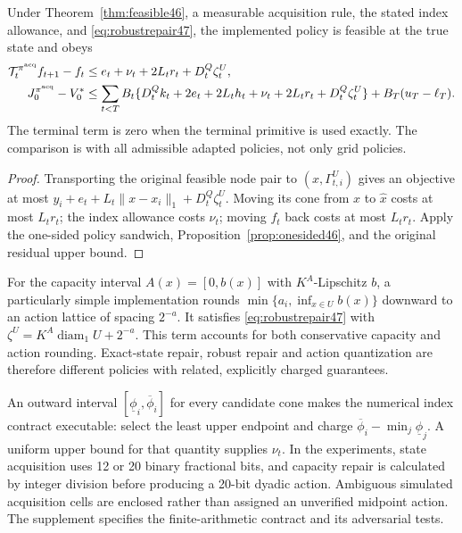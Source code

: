 \begin{theorem}\label{thm:acquired47}
Under Theorem~\ref{thm:feasible46}, a measurable acquisition rule, the stated index allowance, and \eqref{eq:robustrepair47}, the implemented policy is feasible at the true state and obeys
\begin{align}\label{eq:acquired47}
 \mathcal T_t^{\pi^{\rm acq}}f_{t+1}-f_t
 &\le e_t+\nu_t+2L_tr_t+D_t^Q\zeta_t^U,\\
 J_0^{\pi^{\rm acq}}-V_0^*
 &\le\sum_{t<T}B_t
       \{D_t^Qk_t+2e_t+2L_th_t+\nu_t+2L_tr_t+D_t^Q\zeta_t^U\}
       +B_T(u_T-\ell_T).\notag
\end{align}
The terminal term is zero when the terminal primitive is used exactly. The comparison is with all admissible adapted policies, not only grid policies.
\end{theorem}
\begin{proof}
Transporting the original feasible node pair to $(x,\Gamma^U_{t,i})$ gives an objective at most $y_i+e_t+L_t\|x-x_i\|_1+D_t^Q\zeta_t^U$. Moving its cone from $x$ to $\widehat x$ costs at most $L_tr_t$; the index allowance costs $\nu_t$; moving $f_t$ back costs at most $L_tr_t$. Apply the one-sided policy sandwich, Proposition~\ref{prop:onesided46}, and the original residual upper bound.
\end{proof}

For the capacity interval $A(x)=[0,b(x)]$ with $K^A$-Lipschitz $b$, a particularly simple implementation rounds $\min\{a_i,\inf_{x\in U}b(x)\}$ downward to an action lattice of spacing $2^{-a}$. It satisfies \eqref{eq:robustrepair47} with $\zeta^U=K^A\operatorname{diam}_1U+2^{-a}$. This term accounts for both conservative capacity and action rounding. Exact-state repair, robust repair and action quantization are therefore different policies with related, explicitly charged guarantees.

An outward interval $[\underline\phi_i,\overline\phi_i]$ for every candidate cone makes the numerical index contract executable: select the least upper endpoint and charge
$\overline\phi_i-\min_j\underline\phi_j$. A uniform upper bound for that quantity supplies $\nu_t$. In the experiments, state acquisition uses 12 or 20 binary fractional bits, and capacity repair is calculated by integer division before producing a 20-bit dyadic action. Ambiguous simulated acquisition cells are enclosed rather than assigned an unverified midpoint action. The supplement specifies the finite-arithmetic contract and its adversarial tests.

